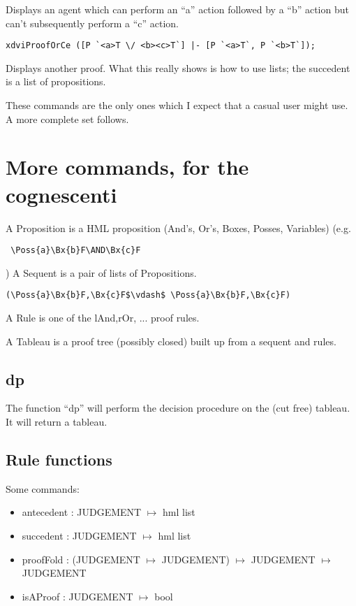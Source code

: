 \documentclass[12pt]{article}
\begin{document}
Displays an agent which can perform an ``a'' action followed by a ``b'' action
but can't subsequently perform a ``c'' action.

\begin{verbatim}
xdviProofOrCe ([P `<a>T \/ <b><c>T`] |- [P `<a>T`, P `<b>T`]);
\end{verbatim}

Displays another proof.  What this really shows is how to use
lists; the succedent is a list of propositions.

These commands are the only ones which I expect that a casual user
might use.  A more complete set follows.

\section{More commands, for the cognescenti}
A Proposition is a HML proposition (And's, Or's, Boxes, Posses, Variables)
(e.g. \begin{verbatim} \Poss{a}\Bx{b}F\AND\Bx{c}F \end{verbatim})
A Sequent is a pair of lists of Propositions.

\begin{verbatim}
(\Poss{a}\Bx{b}F,\Bx{c}F$\vdash$ \Poss{a}\Bx{b}F,\Bx{c}F)
\end{verbatim}

A Rule is one of the lAnd,rOr, ... proof rules.

A Tableau is a proof tree (possibly closed) built
up from a sequent and rules.

\subsection{dp}
The function ``dp'' will perform the decision procedure
on the (cut free) tableau.  It will return a tableau.

\subsection{Rule functions}
Some commands:
\begin{itemize}
\item antecedent : JUDGEMENT $\mapsto$ hml list
\item succedent : JUDGEMENT $\mapsto$ hml list
\item proofFold : (JUDGEMENT $\mapsto$ JUDGEMENT) $\mapsto$ JUDGEMENT $\mapsto$ JUDGEMENT
\item isAProof : JUDGEMENT $\mapsto$ bool
\end{itemize}
\end{document}
